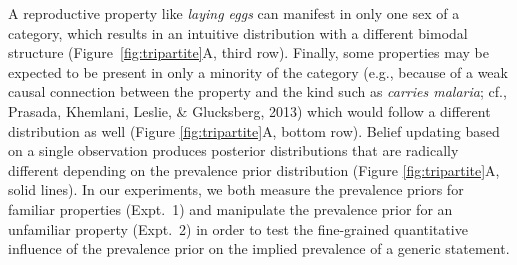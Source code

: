 \documentclass[floatsintext,doc]{apa6}
\begin{document}
A reproductive property like \emph{laying eggs} can manifest in only one sex of a category, which results in an intuitive distribution with a different bimodal structure (Figure~\ref{fig:tripartite}A, third row).  
Finally, some properties may be expected to be present in only a minority of the category (e.g., because of a weak causal connection between the property and the kind such as \emph{carries malaria}; cf., Prasada, Khemlani, Leslie, \& Glucksberg, 2013) which would follow a different distribution as well (Figure \ref{fig:tripartite}A, bottom row). 
Belief updating based on a single observation produces posterior distributions that are radically different depending on the prevalence prior distribution  (Figure \ref{fig:tripartite}A, solid lines).
In our experiments, we both measure the prevalence priors for familiar properties  (Expt.~1) and manipulate the prevalence prior for an unfamiliar property (Expt.~2) in order to test the fine-grained quantitative influence of the prevalence prior on the implied prevalence of a generic statement. 
\end{document}
